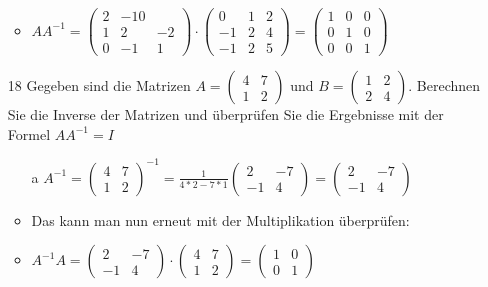 \documentclass{article}
\begin{document}
\begin{itemize}
		\begin{itemize}
			\item{$AA^{-1}=\begin{pmatrix} 2 & -1 0 \\ 1 & 2 & -2 \\ 0 & -1 & 1 \end{pmatrix}\cdot \begin{pmatrix} 0 & 1 & 2 \\ -1 & 2 & 4 \\ -1 & 2 & 5 \end{pmatrix}=\begin{pmatrix} 1 & 0 & 0 \\ 0 & 1 & 0 \\ 0 & 0 & 1 \end{pmatrix}$}
		\end{itemize}
		\item[18]{Gegeben sind die Matrizen $A=\begin{pmatrix} 4 & 7 \\ 1 & 2 \end{pmatrix}$ und $B=\begin{pmatrix} 1 & 2 \\ 2 & 4 \end{pmatrix}$. Berechnen Sie die Inverse der Matrizen und überprüfen Sie die Ergebnisse mit der Formel $AA^{-1}=I$}
		\begin{itemize}
			\item[a]{$A^{-1}=\begin{pmatrix} 4 & 7 \\ 1 & 2 \end{pmatrix}^{-1}=\frac{1}{4*2-7*1}\begin{pmatrix} 2 & -7 \\ -1 & 4 \end{pmatrix}=\begin{pmatrix} 2 & -7 \\ -1 & 4 \end{pmatrix}$}
			\item{Das kann man nun erneut mit der Multiplikation überprüfen:}
			\item{$A^{-1}A=\begin{pmatrix} 2 & -7 \\ -1 & 4 \end{pmatrix}\cdot \begin{pmatrix} 4 & 7 \\ 1 & 2 \end{pmatrix}=\begin{pmatrix} 1 & 0 \\ 0 & 1 \end{pmatrix}$}

\end{itemize}
\end{itemize}
\end{document}
